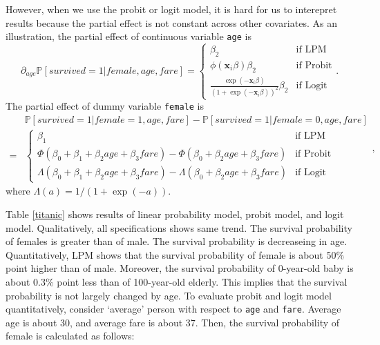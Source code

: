 \documentclass[
  12pt,
]{article}
\begin{document}
However, when we use the probit or logit model, it is hard for us to
interepret results because the partial effect is not constant across
other covariates. As an illustration, the partial effect of continuous
variable \texttt{age} is \begin{equation*}
  \partial_{age} \mathbb{P}[survived = 1 | female, age, fare] =
  \begin{cases}
    \beta_2  &\text{if LPM}  \\
    \phi(\mathbf{x}_i \beta) \beta_2  &\text{if Probit}  \\
    \frac{\exp(-\mathbf{x}_i \beta)}{(1 + \exp(-\mathbf{x}_i \beta))^2} \beta_2 &\text{if Logit}
  \end{cases}.
\end{equation*} The partial effect of dummy variable \texttt{female} is
\begin{equation*}
  \begin{split}
  &\mathbb{P}[survived = 1 | female = 1, age, fare] - \mathbb{P}[survived = 1 | female = 0, age, fare] \\
  =& 
  \begin{cases}
    \beta_1 &\text{if LPM}  \\
    \Phi(\beta_0 + \beta_1 + \beta_2 age + \beta_3 fare) - \Phi(\beta_0 + \beta_2 age + \beta_3 fare)  &\text{if Probit}  \\
    \Lambda(\beta_0 + \beta_1 + \beta_2 age + \beta_3 fare) - \Lambda(\beta_0 + \beta_2 age + \beta_3 fare)  &\text{if Logit}
  \end{cases}
  \end{split},
\end{equation*} where \(\Lambda(a) = 1/(1 + \exp(-a))\).

Table \ref{titanic} shows results of linear probability model, probit
model, and logit model. Qualitatively, all specifications shows same
trend. The survival probability of females is greater than of male. The
survival probability is decreaseing in age. Quantitatively, LPM shows
that the survival probability of female is about 50\% point higher than
of male. Moreover, the survival probability of 0-year-old baby is about
0.3\% point less than of 100-year-old elderly. This implies that the
survival probability is not largely changed by age. To evaluate probit
and logit model quantitatively, consider `average' person with respect
to \texttt{age} and \texttt{fare}. Average age is about 30, and average
fare is about 37. Then, the survival probability of female is calculated
as follows:
\end{document}
